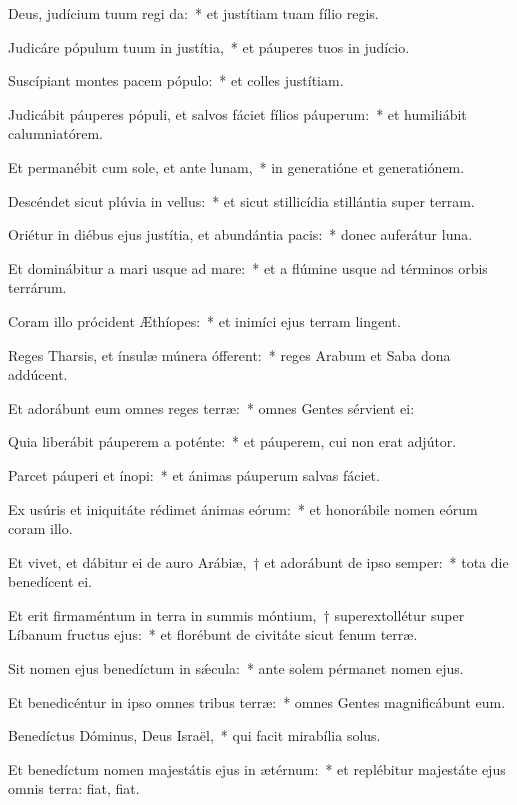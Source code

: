 \item Deus, judícium tuum regi da:~* et justítiam tuam fílio regis.

\item Judicáre pópulum tuum in justítia,~* et páuperes tuos in judício.

\item Suscípiant montes pacem pópulo:~* et colles justítiam.

\item Judicábit páuperes pópuli, et salvos fáciet fílios páuperum:~* et humiliábit calumniatórem.

\item Et permanébit cum sole, et ante lunam,~* in generatióne et generatiónem.

\item Descéndet sicut plúvia in vellus:~* et sicut stillicídia stillántia super terram.

\item Oriétur in diébus ejus justítia, et abundántia pacis:~* donec auferátur luna.

\item Et dominábitur a mari usque ad mare:~* et a flúmine usque ad términos orbis terrárum.

\item Coram illo prócident Æthíopes:~* et inimíci ejus terram lingent.

\item Reges Tharsis, et ínsulæ múnera ófferent:~* reges Arabum et Saba dona addúcent.

\item Et adorábunt eum omnes reges terræ:~* omnes Gentes sérvient ei:

\item Quia liberábit páuperem a poténte:~* et páuperem, cui non erat adjútor.

\item Parcet páuperi et ínopi:~* et ánimas páuperum salvas fáciet.

\item Ex usúris et iniquitáte rédimet ánimas eórum:~* et honorábile nomen eórum coram illo.

\item Et vivet, et dábitur ei de auro Arábiæ,~† et adorábunt de ipso semper:~* tota die benedícent ei.

\item Et erit firmaméntum in terra in summis móntium,~† superextollétur super Líbanum fructus ejus:~* et florébunt de civitáte sicut fenum terræ.

\item Sit nomen ejus benedíctum in sǽcula:~* ante solem pérmanet nomen ejus.

\item Et benedicéntur in ipso omnes tribus terræ:~* omnes Gentes magnificábunt eum.

\item Benedíctus Dóminus, Deus Israël,~* qui facit mirabília solus.

\item Et benedíctum nomen majestátis ejus in ætérnum:~* et replébitur majestáte ejus omnis terra: fiat, fiat.

